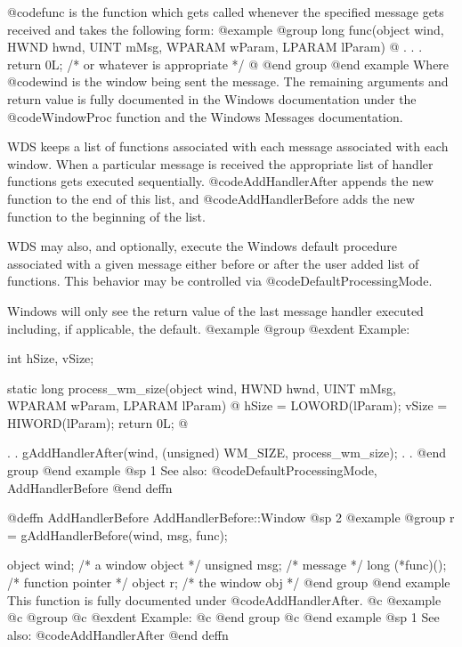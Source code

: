 @code{func} is the function which gets called whenever the specified
message gets received and takes the following form:
@example
@group
long    func(object     wind,
             HWND       hwnd, 
             UINT       mMsg, 
             WPARAM     wParam, 
             LPARAM     lParam)
@{
        .
        .
        .
        return 0L;  /* or whatever is appropriate  */
@}
@end group
@end example
Where @code{wind} is the window being sent the message.  The remaining
arguments and return value is fully documented in the Windows documentation
under the @code{WindowProc} function and the Windows Messages documentation.

WDS keeps a list of functions associated with each message associated
with each window.  When a particular message is received the appropriate
list of handler functions gets executed sequentially.
@code{AddHandlerAfter} appends the new function to the end of this list,
and @code{AddHandlerBefore} adds the new function to the beginning of
the list.

WDS may also, and optionally, execute the Windows default procedure
associated with a given message either before or after the user added
list of functions.  This behavior may be controlled via
@code{DefaultProcessingMode}.

Windows will only see the return value of the last message handler executed
including, if applicable, the default.
@example
@group
@exdent Example:

int     hSize, vSize;

static  long    process_wm_size(object  wind, 
                                HWND    hwnd, 
                                UINT    mMsg, 
                                WPARAM  wParam, 
                                LPARAM  lParam)
@{
        hSize = LOWORD(lParam);
        vSize = HIWORD(lParam);
        return 0L;
@}

        .
        .
        gAddHandlerAfter(wind, (unsigned) WM_SIZE, process_wm_size);
        .
        .
@end group
@end example
@sp 1
See also:  @code{DefaultProcessingMode, AddHandlerBefore}
@end deffn






@deffn {AddHandlerBefore} AddHandlerBefore::Window
@sp 2
@example
@group
r = gAddHandlerBefore(wind, msg, func);

object   wind;     /*  a window object  */
unsigned msg;      /*  message          */
long    (*func)(); /*  function pointer */
object  r;         /*  the window obj   */
@end group
@end example
This function is fully documented under @code{AddHandlerAfter}.
@c @example
@c @group
@c @exdent Example:
@c @end group
@c @end example
@sp 1
See also:  @code{AddHandlerAfter}
@end deffn








